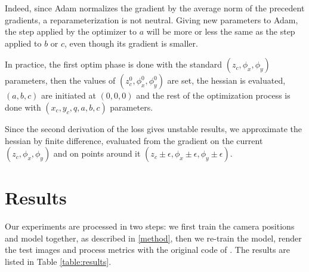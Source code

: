 \documentclass{article}
\begin{document}
Indeed, since Adam normalizes the gradient by the average norm of the precedent gradients, a reparameterization is not neutral.
Giving new parameters to Adam, the step applied by the optimizer to $a$ will be more or less the same as 
the step applied to $b$ or $c$, even though its gradient is smaller.

In practice, the first optim phase is done with the standard $(z_c,\phi_x,\phi_y)$ parameters, then the values of $(z_{c}^0,\phi_x^0,\phi_y^0)$ are set,
the hessian is evaluated, $(a,b,c)$ are initiated at $(0,0,0)$ and the rest of the optimization process is done with $(x_c,y_c,q,a,b,c)$ parameters.

Since the second derivation of the loss gives unstable results, we approximate the hessian by finite difference, evaluated from the gradient on the current
$(z_c,\phi_x,\phi_y)$ and on points around it $(z_c \pm \epsilon, \phi_x \pm \epsilon, \phi_y \pm \epsilon)$.

\section{Results}

Our experiments are processed in two steps: we first train the camera positions and model together, as described in \ref{method},
then we re-train the model, render the test images and process metrics with the original code of \cite{kerbl20233d}.
The results are listed in Table \ref{table:results}.
\end{document}
